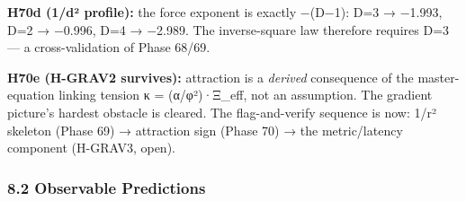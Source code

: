 \documentclass[
]{article}
\begin{document}
\textbf{H70d (1/d² profile):} the force exponent is exactly −(D−1): D=3
→ −1.993, D=2 → −0.996, D=4 → −2.989. The inverse-square law therefore
requires D=3 --- a cross-validation of Phase 68/69.

\textbf{H70e (H-GRAV2 survives):} attraction is a \emph{derived}
consequence of the master-equation linking tension κ = (α/φ²)·Ξ\_eff,
not an assumption. The gradient picture's hardest obstacle is cleared.
The flag-and-verify sequence is now: 1/r² skeleton (Phase 69) →
attraction sign (Phase 70) → the metric/latency component (H-GRAV3,
open).

\subsubsection{8.2 Observable Predictions}\label{observable-predictions}
\end{document}
